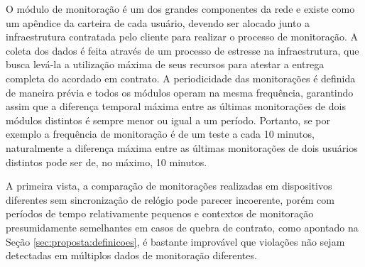 O módulo de monitoração é um dos grandes componentes da rede e existe como um apêndice da carteira de cada usuário, devendo ser alocado junto a infraestrutura contratada pelo cliente para realizar o processo de monitoração. A coleta dos dados é feita através de um processo de estresse na infraestrutura, que busca levá-la a utilização máxima de seus recursos para atestar a entrega completa do acordado em contrato. A periodicidade das monitorações é definida de maneira prévia e todos os módulos operam na mesma frequência, garantindo assim que a diferença temporal máxima entre as últimas monitorações de dois módulos distintos é sempre menor ou igual a um período. Portanto, se por exemplo a frequência de monitoração é de um teste a cada 10 minutos, naturalmente a diferença máxima entre as últimas monitorações de dois usuários distintos pode ser de, no máximo, 10 minutos.

%


%
A primeira vista, a comparação de monitorações realizadas em dispositivos diferentes sem sincronização de relógio pode parecer incoerente, porém com períodos de tempo relativamente pequenos e contextos de monitoração presumidamente semelhantes em casos de quebra de contrato, como apontado na Seção \ref{sec:proposta:definicoes}, é bastante improvável que violações não sejam detectadas em múltiplos dados de monitoração diferentes.

